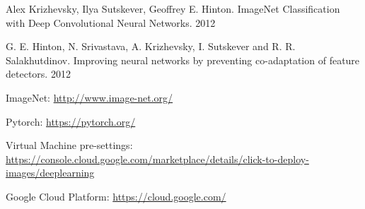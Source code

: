 \documentclass{article}
\begin{document}
\begin{thebibliography}{1}
	Alex Krizhevsky, Ilya Sutskever, Geoffrey E. Hinton. ImageNet Classification with Deep Convolutional
	Neural Networks. 2012
	
	G. E. Hinton, N. Srivastava, A. Krizhevsky, I. Sutskever and R. R. Salakhutdinov.
	Improving neural networks by preventing co-adaptation of feature detectors. 2012
	
	ImageNet: \url{http://www.image-net.org/}
	
	Pytorch: \url{https://pytorch.org/}
	
	Virtual Machine pre-settings: \url{https://console.cloud.google.com/marketplace/details/click-to-deploy-images/deeplearning}
	
	Google Cloud Platform: \url{https://cloud.google.com/}
	
\end{thebibliography}
\end{document}
